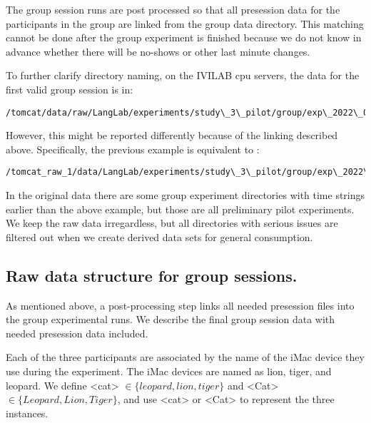 The group session runs are post processed so that all presession data for the
participants in the group are linked from the group data directory. This
matching cannot be done after the group experiment is finished because we do not
know in advance whether there will be no-shows or other last minute changes. 

To further clarify directory naming, on the IVILAB cpu servers,
the data for the first valid group session 
is in:
\begin{lstlisting}
/tomcat/data/raw/LangLab/experiments/study\_3\_pilot/group/exp\_2022\_09\_30\_10
\end{lstlisting}
However, this might be reported  differently because of the linking described
above. Specifically, the previous example is equivalent to :
\begin{lstlisting}
/tomcat_raw_1/data/LangLab/experiments/study\_3\_pilot/group/exp\_2022\_09\_30\_10
\end{lstlisting}
In the original data there are some group experiment directories with time
strings earlier than the above example, but those are all preliminary pilot
experiments. We keep the raw data irregardless, but all directories with serious
issues are filtered out when we create derived data sets for general
consumption.

\subsection{Raw data structure for group sessions.}

As mentioned above, a post-processing step links all needed presession files into
the group experimental runs. We describe the final group session data with
needed presession data included. 


Each of the three participants are associated by the name of the iMac device
they use during the experiment.
The iMac devices are named as lion, tiger, and
leopard. We define 
<cat> $\in \{leopard, lion, tiger\}$ 
and <Cat> $\in \{Leopard, Lion, Tiger\}$,
and use <cat> or <Cat> to represent the three instances. 



